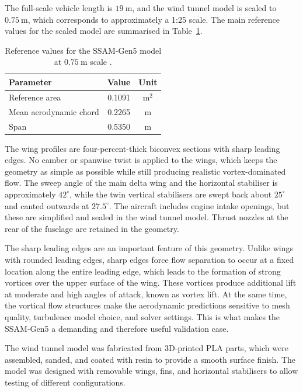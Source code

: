 The full-scale vehicle length is $19~\mathrm{m}$, and the wind tunnel model is scaled to $0.75~\mathrm{m}$, which corresponds to approximately a 1:25 scale. The main reference values for the scaled model are summarised in Table~\ref{tab:ssam_ref_values}.

\begin{table}[H]
\centering
\caption{Reference values for the SSAM-Gen5 model at $0.75~\mathrm{m}$ scale \cite{Giannelis2023SSAMGen5}.}
\label{tab:ssam_ref_values}
\begin{tabular}{lcc}
\hline
\textbf{Parameter} & \textbf{Value} & \textbf{Unit} \\
\hline
Reference area          & 0.1091 & $\mathrm{m^2}$ \\
Mean aerodynamic chord  & 0.2265 & $\mathrm{m}$ \\
Span                    & 0.5350 & $\mathrm{m}$ \\
\hline
\end{tabular}
\end{table}

The wing profiles are four-percent-thick biconvex sections with sharp leading edges. No camber or spanwise twist is applied to the wings, which keeps the geometry as simple as possible while still producing realistic vortex-dominated flow. The sweep angle of the main delta wing and the horizontal stabiliser is approximately $42^{\circ}$, while the twin vertical stabilisers are swept back about $25^{\circ}$ and canted outwards at $27.5^{\circ}$. The aircraft includes engine intake openings, but these are simplified and sealed in the wind tunnel model. Thrust nozzles at the rear of the fuselage are retained in the geometry.

The sharp leading edges are an important feature of this geometry. Unlike wings with rounded leading edges, sharp edges force flow separation to occur at a fixed location along the entire leading edge, which leads to the formation of strong vortices over the upper surface of the wing. These vortices produce additional lift at moderate and high angles of attack, known as vortex lift. At the same time, the vortical flow structures make the aerodynamic predictions sensitive to mesh quality, turbulence model choice, and solver settings. This is what makes the SSAM-Gen5 a demanding and therefore useful validation case.

The wind tunnel model was fabricated from 3D-printed PLA parts, which were assembled, sanded, and coated with resin to provide a smooth surface finish. The model was designed with removable wings, fins, and horizontal stabilisers to allow testing of different configurations.

